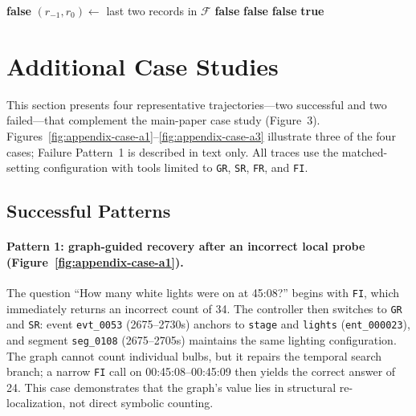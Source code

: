 \documentclass[sigconf, screen, review, anonymous]{acmart}
\begin{document}
\begin{algorithm}[t]
\begin{algorithmic}[1]
    \EndIf
            \State \Return \textbf{false}
        \EndIf
        \State $(r_{-1}, r_{0}) \gets$ last two records in $\mathcal{F}$
            \State \Return \textbf{false}
        \EndIf
            \State \Return \textbf{false}
        \EndIf
    \EndIf
        \State \Return \textbf{false}
    \EndIf
    \State \Return \textbf{true}
\EndFunction
\end{algorithmic}
\end{algorithm}

\section{Additional Case Studies}
\label{sec:cases}

This section presents four representative trajectories---two successful and two failed---that complement the main-paper case study (Figure~3). Figures~\ref{fig:appendix-case-a1}--\ref{fig:appendix-case-a3} illustrate three of the four cases; Failure Pattern~1 is described in text only. All traces use the matched-setting configuration with tools limited to \texttt{GR}, \texttt{SR}, \texttt{FR}, and \texttt{FI}.

\subsection{Successful Patterns}

\paragraph{Pattern 1: graph-guided recovery after an incorrect local probe (Figure~\ref{fig:appendix-case-a1}).}
The question ``How many white lights were on at 45:08?'' begins with
\texttt{FI}, which immediately returns an incorrect count of 34. The controller
then switches to \texttt{GR} and \texttt{SR}: event \texttt{evt\_0053} (2675--2730s)
anchors to \texttt{stage} and \texttt{lights} (\texttt{ent\_000023}), and segment
\texttt{seg\_0108} (2675--2705s) maintains the same lighting configuration. The
graph cannot count individual bulbs, but it repairs the temporal search
branch; a narrow \texttt{FI} call on 00:45:08--00:45:09 then yields the correct
answer of 24. This case demonstrates that the graph's value lies in structural
re-localization, not direct symbolic counting.
\end{document}
